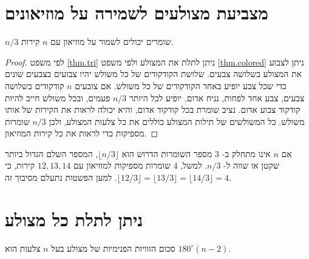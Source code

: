 
\section{מצביעת מצולעים לשמירה על מוזיאונים}\label{s.museum-guard}

\begin{theorem}
$n/3$
שומרים יכולים לשמור על מוזיאון עם 
$n$
קירות.
\end{theorem}
\begin{proof}
לפי משפט
\ref{thm.tri}
ניתן לתלת את המצולע ולפי משפט
\ref{thm.colored}
ניתן לצבוע את המצולע בשלושה צבעים. שלושת הקודקודים של כל משולש יהיו צבועים בצבעים שונים כדי שכל צבע יופיע באחד הקודקודים של כל משולש. אם צובעים 
$n$
קודקודים בשלושה צבעים, צבע אחד לפחות, נניח אדום, יופיע לכל היותר
$n/3$
פעמים, ובכל משולש חייב להיות קודקוד צבוע אדום. נציב שומרת בכל קודקוד אדום, והיא יכולה לראות את הקירות של אותו משולש. כל המשולשים של תילות המצולע כוללים את כל צלעות המצולע, ולכן
$n/3$
שומרות מספיקות כדי לראות את כל קירות המוזיאון.
\end{proof}

אם
$n$
אינו מתחלק ב-%
$3$
מספר השומרות הדרוש הוא
$\lfloor n/3\rfloor$, 
המספר השלם הגדול ביותר שקטן או שווה ל-%
$n/3$.
למשל, 
$4$
שומרות מספיקות למוזיאון עם 
$12, 13, 14$
קירות, כי
$\lfloor 12/3\rfloor =\lfloor 13/3\rfloor=\lfloor 14/3\rfloor=4$. 
למען הפשטות נתעלם מסיבוך זה.


\newpage

\section{ניתן לתלת כל מצולע}\label{s.museum-triangulated}

\begin{theorem}\label{thm.interior-angles-of-a-polygon}
סכום הזוויות הפנימיות של מצולע בעל
$n$
צלעות הוא
$180^\circ(n-2)$.
\end{theorem}

